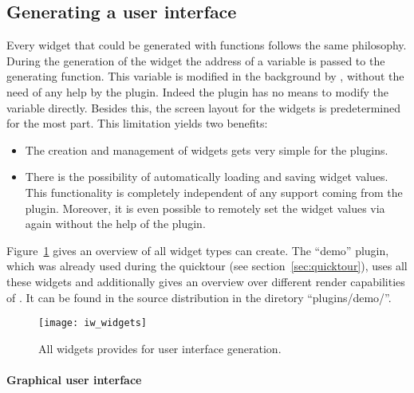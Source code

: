 \subsection{Generating a user interface}
\label{sub:p_widgets}

Every widget that could be generated with \icewing{} functions
follows the same philosophy. During the generation of the widget the
address of a variable is passed to the generating function. This
variable is modified in the background by \icewing{}, without the
need of any help by the plugin. Indeed the plugin has no means to
modify the variable directly. Besides this, the screen layout for
the widgets is predetermined for the most part. This limitation
yields two benefits:
\begin{itemize}
\item The creation and management of widgets gets very simple for
  the plugins.
\item There is the possibility of automatically loading and saving
  widget values. This functionality is completely independent of any
  support coming from the plugin. Moreover, it is even possible to
  remotely set the widget values via \dacs{} again without the help
  of the plugin.
\end{itemize}
Figure~\ref{fig:p_widgets} gives an overview of all widget types
\icewing{} can create. The ``demo'' plugin, which was already used
during the quicktour (see section~\ref{sec:quicktour}), uses all
these widgets and additionally gives an overview over different
render capabilities of \icewing{}. It can be found in the \icewing{}
source distribution in the diretory ``plugins/demo/''.

\begin{figure}[htb]
  \begin{center}
    \texttt{[image: iw\_widgets]}
  \end{center}
  \caption[The widgets of \icewing{}]
  {All widgets \icewing{} provides for user interface generation.}
  \label{fig:p_widgets}
\end{figure}

\paragraph{Graphical user interface}\hfill\\

